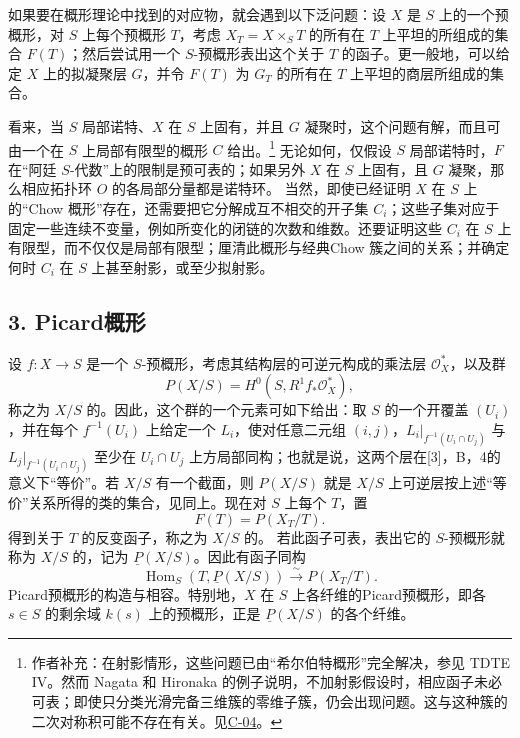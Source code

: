 如果要在概形理论中找到的对应物，就会遇到以下泛问题：设 $X$ 是 $S$ 上的一个预概形，对 $S$ 上每个预概形 $T$，考虑 $X_T=X\times_S T$ 的所有在 $T$ 上平坦的所组成的集合 $F(T)$；然后尝试用一个 $S$-预概形表出这个关于 $T$ 的函子。更一般地，可以给定 $X$ 上的拟凝聚层 $G$，并令 $F(T)$ 为 $G_T$ 的所有在 $T$ 上平坦的商层所组成的集合。

看来，当 $S$ 局部诺特、$X$ 在 $S$ 上固有，并且 $G$ 凝聚时，这个问题有解，而且可由一个在 $S$ 上局部有限型的概形 $C$ 给出。\footnote{作者补充：在射影情形，这些问题已由“希尔伯特概形”完全解决，参见 TDTE IV。然而 Nagata 和 Hironaka 的例子说明，不加射影假设时，相应函子未必可表；即使只分类光滑完备三维簇的零维子簇，仍会出现问题。这与这种簇的二次对称积可能不存在有关。见\hyperref[orig:6]{C-04}。}
无论如何，仅假设 $S$ 局部诺特时，$F$ 在“阿廷 $S$-代数”上的限制是预可表的；如果另外 $X$ 在 $S$ 上固有，且 $G$ 凝聚，那么相应拓扑环 $O$ 的各局部分量都是诺特环。
当然，即使已经证明 $X$ 在 $S$ 上的“Chow 概形”存在，还需要把它分解成互不相交的开子集 $C_i$；这些子集对应于固定一些连续不变量，例如所变化的闭链的次数和维数。还要证明这些 $C_i$ 在 $S$ 上有限型，而不仅仅是局部有限型；厘清此概形与经典Chow 簇之间的关系；并确定何时 $C_i$ 在 $S$ 上甚至射影，或至少拟射影。

\subsection*{3. Picard概形}
设 $f:X\to S$ 是一个 $S$-预概形，考虑其结构层的可逆元构成的乘法层 $\mathcal O_X^*$，以及群
\[
 P(X/S)=H^0(S,R^1f_*\mathcal O_X^*),
\]
称之为 $X/S$ 的。因此，这个群的一个元素可如下给出：取 $S$ 的一个开覆盖 $(U_i)$，并在每个 $f^{-1}(U_i)$ 上给定一个 $L_i$，使对任意二元组 $(i,j)$，$L_i|_{f^{-1}(U_i\cap U_j)}$ 与 $L_j|_{f^{-1}(U_i\cap U_j)}$ 至少在 $U_i\cap U_j$ 上方局部同构；也就是说，这两个层在[3]，B，4的意义下“等价”。若 $X/S$ 有一个截面，则 $P(X/S)$ 就是 $X/S$ 上可逆层按上述“等价”关系所得的类的集合，见同上。现在对 $S$ 上每个 $T$，置
\[
 F(T)=P(X_T/T).
\]
得到关于 $T$ 的反变函子，称之为 $X/S$ 的。
若此函子可表，表出它的 $S$-预概形就称为 $X/S$ 的，记为 $\underline P(X/S)$。因此有函子同构
\[
 \operatorname{Hom}_S(T,\underline P(X/S))\xrightarrow{\sim}P(X_T/T).
\]
Picard预概形的构造与相容。特别地，$X$ 在 $S$ 上各纤维的Picard预概形，即各 $s\in S$ 的剩余域 $k(s)$ 上的预概形，正是 $\underline P(X/S)$ 的各个纤维。

